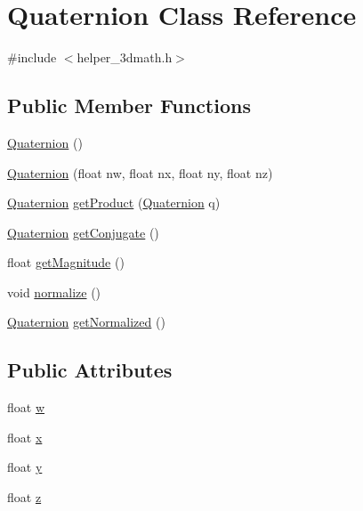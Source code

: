 \hypertarget{classQuaternion}{}\section{Quaternion Class Reference}
\label{classQuaternion}


{\ttfamily \#include $<$helper\+\_\+3dmath.\+h$>$}

\subsection*{Public Member Functions}
\begin{DoxyCompactItemize}
\item 
\hyperlink{classQuaternion_abcc01358aada56ea5f0db4da18aaf77d}{Quaternion} ()
\item 
\hyperlink{classQuaternion_ad8158a59767dc3d42ebf0324b82ba95a}{Quaternion} (float nw, float nx, float ny, float nz)
\item 
\hyperlink{classQuaternion}{Quaternion} \hyperlink{classQuaternion_a3ff8405ed92a3ca16de656e6c83b4028}{get\+Product} (\hyperlink{classQuaternion}{Quaternion} q)
\item 
\hyperlink{classQuaternion}{Quaternion} \hyperlink{classQuaternion_a079a5673188a8a7d608e8495de0dd119}{get\+Conjugate} ()
\item 
float \hyperlink{classQuaternion_a6d0f82bd29fcbe29f784e848ec2eb8f1}{get\+Magnitude} ()
\item 
void \hyperlink{classQuaternion_a48e6bafb249c895ed25f29dc9170e11e}{normalize} ()
\item 
\hyperlink{classQuaternion}{Quaternion} \hyperlink{classQuaternion_a61f5f7cb9b248aa259292c3c1960a1f0}{get\+Normalized} ()
\end{DoxyCompactItemize}
\subsection*{Public Attributes}
\begin{DoxyCompactItemize}
\item 
float \hyperlink{classQuaternion_aa44a65ab99e36f6ab8771030eed8a7ad}{w}
\item 
float \hyperlink{classQuaternion_a8b80f191a3155cc0158d2b4f4d50b2cb}{x}
\item 
float \hyperlink{classQuaternion_a3bd3f270462944423611f44e19d2511b}{y}
\item 
float \hyperlink{classQuaternion_a625cb732d8ff3083e7852b86b736ab29}{z}
\end{DoxyCompactItemize}


